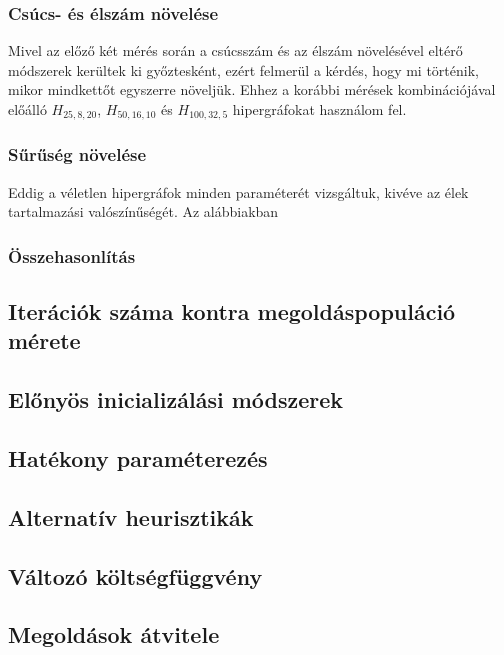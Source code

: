 \subsubsection{Csúcs- és élszám növelése}

Mivel az előző két mérés során a csúcsszám és az élszám növelésével eltérő módszerek kerültek ki győztesként, ezért felmerül a kérdés, hogy mi történik, mikor mindkettőt egyszerre növeljük. Ehhez a korábbi mérések kombinációjával előálló $H_{25,8,20}$, $H_{50,16,10}$ és $H_{100,32,5}$ hipergráfokat használom fel.

\subsubsection{Sűrűség növelése}

Eddig a véletlen hipergráfok minden paraméterét vizsgáltuk, kivéve az élek tartalmazási valószínűségét. Az alábbiakban 


\subsubsection{Összehasonlítás}

\subsection{Iterációk száma kontra megoldáspopuláció mérete}


\subsection{Előnyös inicializálási módszerek}


\subsection{Hatékony paraméterezés}


\subsection{Alternatív heurisztikák}


\subsection{Változó költségfüggvény}


\subsection{Megoldások átvitele}



